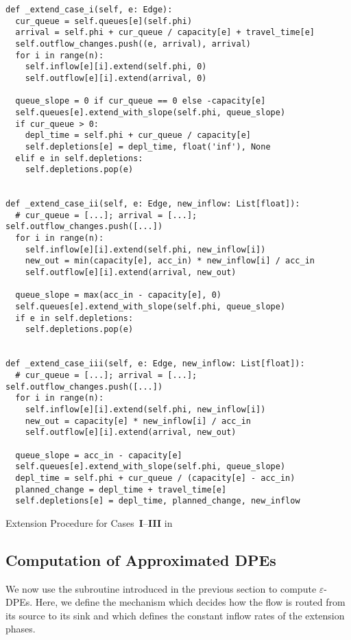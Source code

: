\begin{algorithm}
    \begin{verbatim}
def _extend_case_i(self, e: Edge):
  cur_queue = self.queues[e](self.phi)
  arrival = self.phi + cur_queue / capacity[e] + travel_time[e]
  self.outflow_changes.push((e, arrival), arrival)
  for i in range(n):
    self.inflow[e][i].extend(self.phi, 0)
    self.outflow[e][i].extend(arrival, 0)

  queue_slope = 0 if cur_queue == 0 else -capacity[e]
  self.queues[e].extend_with_slope(self.phi, queue_slope)
  if cur_queue > 0:
    depl_time = self.phi + cur_queue / capacity[e]
    self.depletions[e] = depl_time, float('inf'), None
  elif e in self.depletions:
    self.depletions.pop(e)


def _extend_case_ii(self, e: Edge, new_inflow: List[float]):
  # cur_queue = [...]; arrival = [...]; self.outflow_changes.push([...])
  for i in range(n):
    self.inflow[e][i].extend(self.phi, new_inflow[i])
    new_out = min(capacity[e], acc_in) * new_inflow[i] / acc_in
    self.outflow[e][i].extend(arrival, new_out)

  queue_slope = max(acc_in - capacity[e], 0)
  self.queues[e].extend_with_slope(self.phi, queue_slope)
  if e in self.depletions:
    self.depletions.pop(e)


def _extend_case_iii(self, e: Edge, new_inflow: List[float]):
  # cur_queue = [...]; arrival = [...]; self.outflow_changes.push([...])
  for i in range(n):
    self.inflow[e][i].extend(self.phi, new_inflow[i])
    new_out = capacity[e] * new_inflow[i] / acc_in
    self.outflow[e][i].extend(arrival, new_out)

  queue_slope = acc_in - capacity[e]
  self.queues[e].extend_with_slope(self.phi, queue_slope)
  depl_time = self.phi + cur_queue / (capacity[e] - acc_in)
  planned_change = depl_time + travel_time[e]
  self.depletions[e] = depl_time, planned_change, new_inflow
\end{verbatim}
\caption{Extension Procedure for Cases~\textbf{I}--\textbf{III} in }
\label{alg:extend-cases}
\end{algorithm}


\subsection{Computation of Approximated DPEs}\label{sec:compute-dpes}

We now use the subroutine introduced in the previous section to compute $\varepsilon$-DPEs.
Here, we define the mechanism which decides how the flow is routed from its source to its sink and which defines the constant inflow rates of the extension phases.

